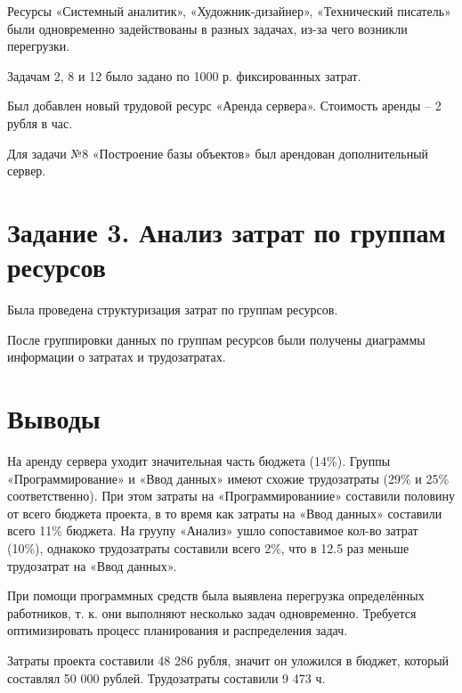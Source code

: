 Ресурсы «Системный аналитик», «Художник-дизайнер», «Технический писатель» были одновременно задействованы в разных задачах, из-за чего возникли перегрузки.

Задачам 2, 8 и 12 было задано по 1000 р. фиксированных затрат.

Был добавлен новый трудовой ресурс «Аренда сервера». Стоимость аренды – 2 рубля в час.

Для задачи №8 «Построение базы объектов» был арендован дополнительный сервер.
\newpage

\section*{Задание 3. Анализ затрат по группам ресурсов}
Была проведена структуризация затрат по группам ресурсов.

После группировки данных по группам ресурсов были получены диаграммы информации о затратах и трудозатратах.

\section*{Выводы}
На аренду сервера уходит значительная часть бюджета (14\%). Группы «Программирование» и «Ввод данных» имеют схожие трудозатраты (29\% и 25\% соответственно). При этом затраты на «Программированиие» составили половину от всего бюджета проекта, в то время как затраты на «Ввод данных» составили всего 11\% бюджета. На груупу «Анализ» ушло сопоставимое кол-во затрат (10\%), однакоко трудозатраты составили всего 2\%, что в 12.5 раз меньше трудозатрат на «Ввод данных».

При помощи программных средств была выявлена перегрузка определённых работников, т. к. они выполняют несколько задач одновременно. Требуется оптимизировать процесс планирования и распределения задач. 

Затраты проекта составили 48 286 рубля, значит он уложился в бюджет, который составлял 50 000 рублей. Трудозатраты составили 9 473 ч.
